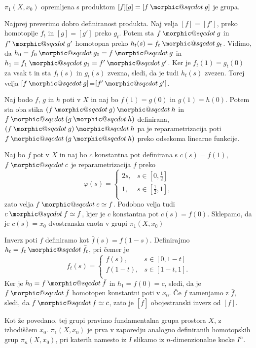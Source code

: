\documentclass[mat1]{fmfdelo}
\makeatletter
\DeclareRobustCommand{\sqcdot}{\mathbin{\mathpalette\morphic@sqcdot\relax}}
\newcommand{\morphic@sqcdot}[2]{%
\sbox\z@{$\m@th#1\centerdot$}%
\ht\z@=.33333\ht\z@
\vcenter{\box\z@}%
}
\makeatother
\begin{document}
    \begin{izrek}
        $\pi_1(X,x_0)$ opremljena s produktom $[f][g] = [f\sqcdot g]$ je grupa.
    \end{izrek}



\begin{dokaz}
    Najprej preverimo dobro definiranost produkta. Naj velja $[f]=[f']$, preko homotopije $f_t$ in $[g]=[g']$ preko $g_t$. Potem sta $f\sqcdot g$ in $f'\sqcdot g'$ homotopna preko
    $h_t(s) =f_t \sqcdot g_t$. Vidimo, da $h_0=f_0 \sqcdot g_0=f \sqcdot g$ in $h_1=f_1 \sqcdot g_1=f'\sqcdot g'$. Ker je $f_t(1)=g_t(0)$ za vsak t in sta $f_t(s)$ in $g_t(s)$ zvezna, sledi, da je tudi $h_t(s)$ zvezen. Torej velja $[f\sqcdot g]$=$[f'\sqcdot g']$.
    
    Naj bodo $f$, $g$ in $h$ poti v $X$ in naj bo $f(1)=g(0)$ in 
    $g(1)=h(0)$. Potem sta oba stika $(f\sqcdot g) \sqcdot h$ in 
    $f\sqcdot (g \sqcdot h)$ definirana, $(f\sqcdot g) \sqcdot h$ pa je
    reparametrizacija poti $f\sqcdot (g \sqcdot h)$ preko odsekoma linearne 
         funkcije.


Naj bo $f$ pot v $X$ in naj bo $c$ konstantna pot definirana s $c(s)=f(1)$, $f\sqcdot c$ je reparametrizacija $f$ preko 
$$\varphi(s)=\begin{cases}
2s, &s \in [0,\frac{1}{2}] \\
1, & s \in [\frac{1}{2},1],\\
\end{cases}
$$zato velja $f\sqcdot c\simeq f$. Podobno velja tudi  $c\sqcdot f\simeq f$, kjer je $c$ konstantna pot $c(s)=f(0)$. Sklepamo, da je $c(s)=x_0$ dvostranska enota v grupi  $\pi_1(X,x_0)$
     
Inverz poti $f$ definiramo kot $\bar{f}(s)=f(1-s)$. Definirajmo $h_t=f_t\sqcdot \bar{f_t}$, pri čemer je 
$$
f_t(s)=
\begin{cases}
    f(s), &s \in [0,1-t] \\
    f(1-t), & s \in [1-t,1]. \\
\end{cases}
$$
Ker je $h_0=f\sqcdot \bar{f}$ in $h_1=f(0)=c$, sledi, da je $f\sqcdot \bar{f}$ homotopen konstantni poti v $x_0$. Če $f$ zamenjamo z $\bar{f}$, sledi, da $\bar{f}\sqcdot f\simeq c$, zato je $[\bar{f}]$ obojestranski inverz od $[f]$.
\end{dokaz}


Kot že povedano, tej grupi pravimo fundamentalna grupa prostora $X$, z izhodiščem $x_0$. $\pi_1(X,x_0)$ je prva v zaporedju analogno definiranih homotopskih grup $\pi_n(X,x_0)$, pri katerih namesto iz $I$ slikamo iz $n$-dimenzionalne kocke $I^n$.
\end{document}
